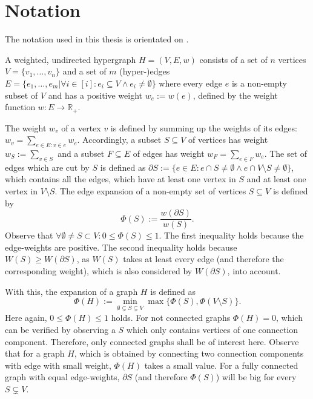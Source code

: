 \chapter{Notation}\label{chapter:notation}

The notation used in this thesis is orientated on \cite{ChanLTZ16}.

A weighted, undirected hypergraph $H = (V, E, w)$ consists of a set of $n$ vertices $V = \{v_1, \ldots, v_n\}$ and a set of $m$ (hyper-)edges $E = \{ e_1, \ldots , e_m | \forall i \in [i]: e_i \subseteq V \land e_i \neq \emptyset \} $ where every edge $e$ is a non-empty subset of $V$ and has a positive weight $w_e:= w(e) $, defined by the weight function $w: E \to  \mathbb{R}_+ $.

The weight $w_v$ of a vertex $v$ is defined by summing up the weights of its edges: $w_v = \sum_{e\in E: v\in e} w_e$. Accordingly, a subset $S\subseteq V$ of vertices has weight $w_S := \sum_{v\in S}$ and a subset $F \subseteq E $ of edges has weight $w_F = \sum_{e\in F} w_e$. The set of edges which are cut by $S$ is defined as $\partial S:= \{e\in E : e \cap S \neq \emptyset \land  e \cap V \setminus S \neq \emptyset  \}$, which contains all the edges, which have at least one vertex in $S$ and at least one vertex in $V\setminus S$. 
The edge expansion of a non-empty set of vertices $S \subseteq V$ is defined by \begin{equation}
\Phi(S):= \frac{w(\partial S)}{w(S)}.
\end{equation}
Observe that $\forall \emptyset \neq S \subset V : 0\le \Phi(S) \le 1 $. The first inequality holds because the edge-weights are positive. The second inequality holds because $W(S) \ge W(\partial S)$, as $W(S)$ takes at least every edge (and therefore the corresponding weight), which is also considered by $W(\partial S)$, into account.


With this, the expansion of a graph $H$ is defined as \begin{equation}
	\Phi(H) := \min_{\emptyset \subsetneq S \subsetneq V} \max \{\Phi(S), \Phi(V\setminus S)\}.
\end{equation} Here again, $0\le \Phi(H)\le 1$ holds.
For not connected graphs $\Phi(H) = 0$, which can be verified by observing a $S$ which only contains vertices of one connection component. Therefore, only connected graphs shall be of interest here.
Observe that for a graph $H$, which is obtained by connecting two connection components with edge with small weight, $\Phi(H)$ takes a small value. For a fully connected graph with equal edge-weights,  $\partial S$ (and therefore $\Phi(S)$) will be big for every $S\subsetneq V$.

